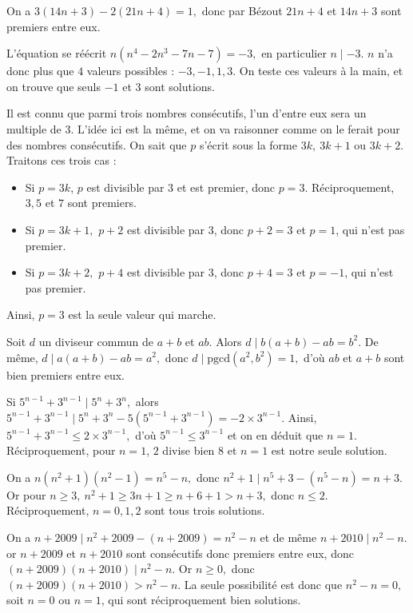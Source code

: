 \begin{sol}
On a $3(14n+3)-2(21n+4)=1,$ donc par Bézout $21n+4$ et $14n+3$ sont premiers entre eux.
\end{sol}
\begin{sol}
L'équation se réécrit $n(n^4-2n^3-7n-7)=-3,$ en particulier $n\mid -3$. $n$ n'a donc plus que $4$ valeurs possibles : $-3,-1,1,3.$ On teste ces valeurs à la main, et on trouve que seuls $-1$ et $3$ sont solutions.
\end{sol}
\begin{sol}
Il est connu que parmi trois nombres consécutifs, l'un d'entre eux sera un multiple de $3$. L'idée ici est la même, et on va raisonner comme on le ferait pour des nombres consécutifs. On sait que $p$ s'écrit sous la forme $3k,\:3k+1$ ou $3k+2$. Traitons ces trois cas :\\
\begin{itemize}
    \item Si $p=3k$, $p$ est divisible par $3$ et est premier, donc $p=3.$ Réciproquement, $3,5$ et $7$ sont premiers.
    \item Si $p=3k+1,$ $p+2$ est divisible par $3$, donc $p+2=3$ et $p=1$, qui n'est pas premier.
    \item Si $p=3k+2,$ $p+4$ est divisible par $3$, donc $p+4=3$ et $p=-1$, qui n'est pas premier.
\end{itemize}
Ainsi, $p=3$ est la seule valeur qui marche.
\end{sol}
\begin{sol}
Soit $d$ un diviseur commun de $a+b$ et $ab.$ Alors $d\mid b(a+b)-ab=b^2.$ De même, $d\mid a(a+b)-ab=a^2,$ donc $d\mid \mathrm{pgcd}(a^2,b^2)=1,$ d'où $ab$ et $a+b$ sont bien premiers entre eux.
\end{sol}
\begin{sol}
Si $5^{n-1}+3^{n-1}\mid 5^n+3^n,$ alors $5^{n-1}+3^{n-1}\mid 5^n+3^n-5(5^{n-1}+3^{n-1})=-2\times 3^{n-1}.$ Ainsi, $5^{n-1}+3^{n-1}\leqslant 2\times 3^{n-1},$ d'où $5^{n-1}\leqslant 3^{n-1}$ et on en déduit que $n=1$. Réciproquement, pour $n=1$, $2$ divise bien $8$ et $n=1$ est notre seule solution.
\end{sol}
\begin{sol}
On a $n(n^2+1)(n^2-1)=n^5-n,$ donc $n^2+1\mid n^5+3-(n^5-n)=n+3.$ Or pour $n\ge 3,\:n^2+1\geqslant 3n+1\geqslant n+6+1>n+3,$ donc $n\leqslant 2.$ Réciproquement, $n=0,1,2$ sont tous trois solutions.
\end{sol}
\begin{sol}
On a $n+2009\mid n^2+2009-(n+2009)=n^2-n$ et de même $n+2010\mid n^2-n.$ or $n+2009$ et $n+2010$ sont consécutifs donc premiers entre eux, donc $(n+2009)(n+2010)\mid n^2-n.$ Or $n\geqslant 0,$ donc $(n+2009)(n+2010)> n^2-n$. La seule possibilité est donc que $n^2-n=0,$ soit $n=0$ ou $n=1$, qui sont réciproquement bien solutions.
\end{sol}
